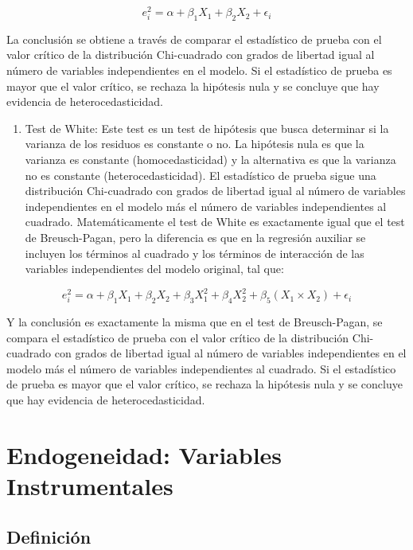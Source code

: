 \documentclass[
]{book}
\providecommand{\tightlist}{%
  \setlength{\itemsep}{0pt}\setlength{\parskip}{0pt}}
\begin{document}
\[
e_i^2 = \alpha + \beta_1 X_1 + \beta_2 X_2 + \epsilon_i
\]

La conclusión se obtiene a través de comparar el estadístico de prueba con el valor crítico de la distribución Chi-cuadrado con grados de libertad igual al número de variables independientes en el modelo. Si el estadístico de prueba es mayor que el valor crítico, se rechaza la hipótesis nula y se concluye que hay evidencia de heterocedasticidad.

\begin{enumerate}
\def\labelenumi{\arabic{enumi})}
\setcounter{enumi}{1}
\tightlist
\item
  Test de White: Este test es un test de hipótesis que busca determinar si la varianza de los residuos es constante o no. La hipótesis nula es que la varianza es constante (homocedasticidad) y la alternativa es que la varianza no es constante (heterocedasticidad). El estadístico de prueba sigue una distribución Chi-cuadrado con grados de libertad igual al número de variables independientes en el modelo más el número de variables independientes al cuadrado.
  Matemáticamente el test de White es exactamente igual que el test de Breusch-Pagan, pero la diferencia es que en la regresión auxiliar se incluyen los términos al cuadrado y los términos de interacción de las variables independientes del modelo original, tal que:
\end{enumerate}

\[
e_i^2 = \alpha + \beta_1 X_1 + \beta_2 X_2 + \beta_3 X_1^2 + \beta_4 X_2^2 + \beta_5 (X_1 \times X_2) + \epsilon_i
\]

Y la conclusión es exactamente la misma que en el test de Breusch-Pagan, se compara el estadístico de prueba con el valor crítico de la distribución Chi-cuadrado con grados de libertad igual al número de variables independientes en el modelo más el número de variables independientes al cuadrado. Si el estadístico de prueba es mayor que el valor crítico, se rechaza la hipótesis nula y se concluye que hay evidencia de heterocedasticidad.

\chapter{Endogeneidad: Variables Instrumentales}\label{endogeneidad-variables-instrumentales}

\section{Definición}\label{definiciuxf3n-3}
\end{document}
